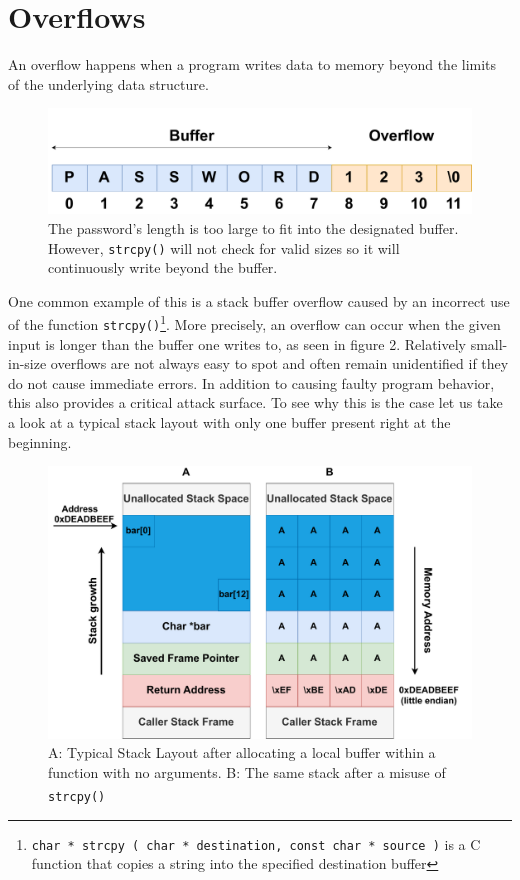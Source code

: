 \documentclass[10pt,twocolumn,a4paper]{article}
\begin{document}
\section{Overflows}\label{sec:Overflows}
An overflow happens when a program writes data to memory beyond the limits of the underlying data structure.
\begin{figure}[h]
\centering
\includegraphics[keepaspectratio,width=\linewidth,trim={0 0 0 1.5cm}]{fig/simpleoverflow}
\caption{The password's length is too large to fit into the designated buffer. However, \texttt{strcpy()} will not check for valid sizes so it will continuously write beyond the buffer.}
\end{figure}\newline
One common example of this is a stack buffer overflow caused by an incorrect use of the function \texttt{strcpy()}\footnote{\texttt{char * strcpy ( char * destination, const char * source )} is a C function that copies a string into the specified destination buffer}.\newline
More precisely, an overflow can occur when the given input is longer than the buffer one writes to, as seen in figure 2.
Relatively small-in-size overflows are not always easy to spot and often remain unidentified if they do not cause immediate errors.
In addition to causing faulty program behavior, this also provides a critical attack surface.
To see why this is the case let us take a look at a typical stack layout with only one buffer present right at the beginning.
\begin{figure}[h]
	\begin{center}
		\centering
		\includegraphics[keepaspectratio,width=\linewidth,trim={1cm 0 1cm 0}]{fig/Stacks}
		\caption{ A: Typical Stack Layout after allocating a local buffer within a function with no arguments. \newline B: The same stack after a misuse of \texttt{strcpy()}\textsuperscript{\cite{wiki}}}
	\end{center}
\end{figure}
\end{document}
